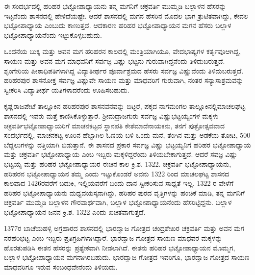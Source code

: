 ಈ ಸಂದರ್ಭದಲ್ಲಿ ಹರಿಹರ ಭಟ್ಟೋಪಾಧ್ಯಾಯನು ತನ್ನ ಮಗನಿಗೆ ಚಕ್ರವರ್ತಿ ಮುಮ್ಮಡಿ ಬಲ್ಲಾಳನ ಹೆಸರನ್ನು ಇಟ್ಟನೆಂದು ಶಾಸನದಲ್ಲಿ ಹೇಳಿದೆಯಷ್ಟೇ. ಆದರೆ ಶಾಸನದಲ್ಲಿ ಮಗನ ಹೆಸರಿನ ಮೊದಲ ಭಾಗ ತ್ರುಟಿತವಾಗಿದ್ದು, ಕೇವಲ ಭಟ್ಟೋಪಾಧ್ಯಾಯ ಎಂಬುದು ಕಾಣುತ್ತದೆ. ಆದಕಾರಣ ಹರಿಹರ ಭಟ್ಟೋಪಾಧ್ಯಾಯನ ಮಗನ ಹೆಸರು ಬಲ್ಲಾಳ ಭಟ್ಟೋಪಾಧ್ಯಾಯನೆಂದು ಇಟ್ಟುಕೊಳ್ಳಬಹುದು.

ಒಂದನೆಯ ಬುಕ್ಕ ಮತ್ತು ಅವನ ಮಗ ಹರಿಹರನ ಕಾಲದಲ್ಲಿ ಮಂತ್ರಿಯಾಗಿಯೂ, ವೇದಭಾಷ್ಯಗಳ ಕರ್ತೃವೂ\break ಆಗಿದ್ದ, ಸಾಯಣ ಮತ್ತು ಅವನ ಮಗ ಮಾಧವನಿಗೆ ಸರ್ವಜ್ಞ ವಿಷ್ಣು ಭಟ್ಟನು ಗುರುವಾಗಿದ್ದನೆಂದು ತಿಳಿದುಬರುತ್ತದೆ. ಶೃಂಗೇರಿಯ ಪೀಠಾಧಿಪತಿಗಳಾಗಿದ್ದ ವಿದ್ಯಾತೀರ್ಥರ ಪೂರ್ವಾಶ್ರಮದ ಹೆಸರು ಸರ್ವಜ್ಞ ವಿಷ್ಣುವೆಂದು ತಿಳಿದುಬರುತ್ತದೆ. ಹರಿಹರಪುರ ಶಾಸನೋಕ್ತ ಸರ್ವಜ್ಞ ವಿಷ್ಣುವೇ ಸಾಯಣ ಮತ್ತು ಮಾಧವರಿಗೆ ಗುರುವಾಗಿ, ನಂತರ ಸನ್ಯಾಸಾಶ್ರಮವನ್ನು ಸ್ವೀಕರಿಸಿ ವಿದ್ಯಾತೀರ್ಥ ಯತಿಗಳಾದರೆಂದು ಊಹಿಸಬಹುದು.

ಕೃಷ್ಣರಾಜಪೇಟೆ ತಾಲ್ಲೂಕಿನ ಹರಿಹರಪುರ ಶಾಸನವನವನ್ನು ಬಿಟ್ಟರೆ, ಪಕ್ಕದ ನಾಗಮಂಗಲ ತಾಲ್ಲೂಕಿನಲ್ಲಿ\break ಮಾಚಲಘಟ್ಟ ಶಾಸನದಲ್ಲಿ ಇವರು ಮತ್ತೆ ಕಾಣಿಸಿಕೊಳ್ಳುತ್ತಾರೆ. ಶ‍್ರೀಮದ್ರಾಜಗುರು ಸರ್ವಜ್ಞ ವಿಷ್ಣುಭಟ್ಟಯ್ಯಂಗಳ ಮಕ್ಕಳು ಚಕ್ರವರ್ತಿಭಟ್ಟೋಪಾಧ್ಯಾಯರಿಗೆ ಮಾಚನಕಟ್ಟದ ಸ್ಥಾನಪತಿ ಕೇತೆಮಾದೆನಾಯಕನು, ತನಗೆ ಪುತ್ರೋತ್ಸವವಾದ ಸಂದರ್ಭದಲ್ಲಿ, ಮಾಚನಕಟ್ಟ ಊರಿನ ಹೆಬ್ಬಾಗಿಲ ಓಣಿಯ ಬಳಿ ಒಂದು ಮನೆ, ತೆಂಗಿನ ಮತ್ತು ಅಡಕೆಯ ತೋಟ, 500 ಬೆದ್ದಲುಗಳನ್ನು ದತ್ತಿಯಾಗಿ ಬಿಡುತ್ತಾನೆ. ಈ ಶಾಸನದ ಪ್ರಕಾರ ಸರ್ವಜ್ಞ ವಿಷ್ಣು ಭಟ್ಟಯ್ಯನಿಗೆ ಹರಿಹರ ಭಟ್ಟೋಪಾಧ್ಯಾಯ ಮತ್ತು ಚಕ್ರವರ್ತಿ ಭಟ್ಟೋಪಾಧ್ಯಾಯ ಎಂಬ ಇಬ್ಬರು ಮಕ್ಕಳಿದ್ದರೆಂದು ತಿಳಿಯಬೇಕಾಗುತ್ತದೆ. ಆದರೆ ಸವಜ್ಞ ವಿಷ್ಣು ಭಟ್ಟಯ್ಯ ಮತ್ತು ಹರಿಹರ ಭಟ್ಟೋಪಾಧ್ಯಾಯರ ಈಚಿನ ಕಾಲ ಕ್ರಿ.ಶ. 1322. ಚಕ್ರವರ್ತಿ ಭಟ್ಟೋಪಾಧ್ಯಾಯನು, ಹರಿಹರನ ಭಟ್ಟೋಪಾಧ್ಯಾಯನ ತಮ್ಮ ಎಂದು ಇಟ್ಟುಕೊಂಡರೆ ಅವನು 1322 ರಿಂದ ಮಾಚಲಘಟ್ಟ ಶಾಸನದ ಕಾಲವಾದ 1426ರವರೆಗೆ ಬದುಕಿ, ಇಲ್ಲಿಯವರೆಗೆ ಬಂದು ದಾನ ಸ್ವೀಕರಿಸುವ ಸಾಧ್ಯತೆ ಇಲ್ಲ. 1322 ರ ವೇಳೆಗೆ ಹರಿಹರ ಭಟ್ಟೋಪಾಧ್ಯಾಯನು ಮಧ್ಯವಯಸ್ಕನಾಗಿದ್ದು, ಹರಿಹರ ಪುರದ ವೃತ್ತಿಗಳನ್ನು ಹಂಚಿಕೆ ಮಾಡಿ, ತನ್ನ ಮಗನಿಗೆ ಚಕ್ರವರ್ತಿ ಮುಮ್ಮಡಿ ಬಲ್ಲಾಳನ ಗೌರವಾರ್ಥವಾಗಿ, ಬಲ್ಲಾಳ ಭಟ್ಟೋಪಾಧ್ಯಾಯನೆಂದು ಹೆಸರಿಟ್ಟಿದ್ದನು. ಬಲ್ಲಾಳ ಭಟ್ಟೋಪಾಧ್ಯಾಯನ ಜನನ ಕ್ರಿ.ಶ. 1322 ಎಂದು ಖಚಿತವಾಗುತ್ತದೆ.

1377ರ ಬಾಚೆಯಹಳ್ಳಿ ಅಗ್ರಹಾರದ ಶಾಸನದಲ್ಲಿ ಭಾರದ್ವಾಜ ಗೋತ್ರದ ಚಂದ್ರಶೇಖರ ಚಕ್ರವರ್ತಿ ಮತ್ತು ಅವನ ಮಗ ನರಹರಿಭಟ್ಟ ಎಂಬ ಇಬ್ಬರು ಪ್ರತಿಗ್ರಹಿಗಳಾಗಿದ್ದಾರೆ. ಭಾರದ್ವಾಜ ಗೋತ್ರದ ಸಾಯಣ ಮಾಧವರ ಮಕ್ಕಳನ್ನು ಹೊರತುಪಡಿಸಿ ಈತನ ಹೆಸರನ್ನು ಪ್ರತ್ಯೇಕವಾಗಿ ನೀಡಲಾಗಿದೆ. ಈತನು ಹರಿಹರ ಭಟ್ಟೋಪಾಧ್ಯಾಯನ ಮೊಮ್ಮಗ, ಬಲ್ಲಾಳ ಭಟ್ಟೋಪಾಧ್ಯಾಯನ ಮಗನಾಗಿರಬಹುದು. ಭಾರದ್ವಾಜ ಗೋತ್ರದ ಇವರಿಗೂ, ಭಾರದ್ವಾಜ ಗೋತ್ರದ ಸಾಯಣ ಮಾಧವರಿಗೂ ಇರುವ ಸಂಬಂಧವೇನೆಂದು ತಿಳಿಯದು.

